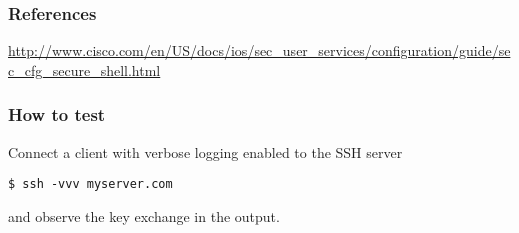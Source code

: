 \subsubsection{References}
\begin{itemize*}
  \item \url{http://www.cisco.com/en/US/docs/ios/sec\_user\_services/configuration/guide/sec\_cfg\_secure\_shell.html}
\end{itemize*}

\subsubsection{How to test}
Connect a client with verbose logging enabled to the SSH server
\begin{lstlisting}
$ ssh -vvv myserver.com
\end{lstlisting}and observe the key exchange in the output.
